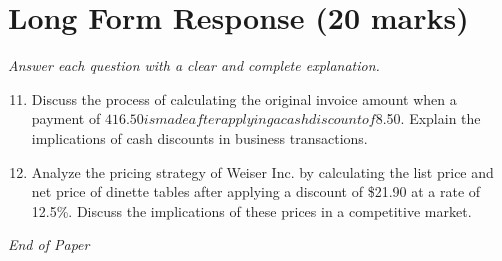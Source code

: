 \documentclass[12pt]{article}
\begin{document}
\section*{Long Form Response (20 marks)}
\textit{Answer each question with a clear and complete explanation.}
\begin{enumerate}[label=\arabic*.]
\setcounter{enumi}{10}
\item Discuss the process of calculating the original invoice amount when a payment of $416.50 is made after applying a cash discount of $8.50. Explain the implications of cash discounts in business transactions.
\item Analyze the pricing strategy of Weiser Inc. by calculating the list price and net price of dinette tables after applying a discount of \$21.90 at a rate of 12.5\%. Discuss the implications of these prices in a competitive market.
\end{enumerate}

\vfill
\noindent\textit{End of Paper}
\end{document}
